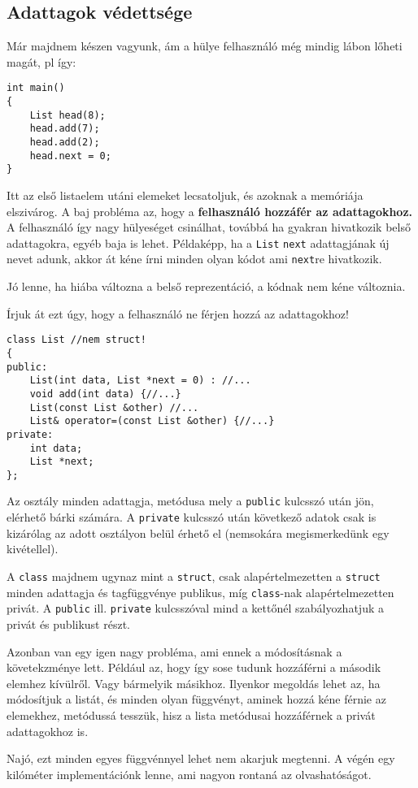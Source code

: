\documentclass[a4paper,11.5pt,table]{article}
\begin{document}
	\subsection{Adattagok védettsége}
	Már majdnem készen vagyunk, ám a hülye felhasználó még mindig lábon lőheti magát, pl így:
	\begin{lstlisting}
int main()
{
	List head(8);
	head.add(7);
	head.add(2);
	head.next = 0;
}
	\end{lstlisting}
	Itt az első listaelem utáni elemeket lecsatoljuk, és azoknak a memóriája elszivárog. A baj probléma az, hogy a \textbf{felhasználó hozzáfér az adattagokhoz.} A felhasználó így nagy hülyeséget csinálhat, továbbá ha gyakran hivatkozik belső adattagokra, egyéb baja is lehet. Példaképp, ha a \texttt{List} \texttt{next} adattagjának új nevet adunk, akkor át kéne írni minden olyan kódot ami \texttt{next}re hivatkozik.
	
	Jó lenne, ha hiába változna a belső reprezentáció, a kódnak nem kéne változnia. 
	
	Írjuk át ezt úgy, hogy a felhasználó ne férjen hozzá az adattagokhoz!

\begin{lstlisting}
class List //nem struct!
{
public:
	List(int data, List *next = 0) : //...
	void add(int data) {//...}
	List(const List &other) //...
	List& operator=(const List &other) {//...}
private:
	int data;
	List *next;
};
\end{lstlisting}
	Az osztály minden adattagja, metódusa mely a \texttt{public} kulcsszó után jön, elérhető bárki számára. A \texttt{private} kulcsszó után következő adatok csak is kizárólag az adott osztályon belül érhető el (nemsokára megismerkedünk egy kivétellel).

	A \texttt{class} majdnem ugynaz mint a \texttt{struct}, csak alapértelmezetten a \texttt{struct} minden adattagja és tagfüggvénye publikus, míg \texttt{class}-nak alapértelmezetten privát. A \texttt{public} ill. \texttt{private} kulcsszóval mind a kettőnél szabályozhatjuk a privát és publikust részt.
	
	\medskip
	Azonban van egy igen nagy probléma, ami ennek a módosításnak a követekzménye lett. Például az, hogy így sose tudunk hozzáférni a második elemhez kívülről. Vagy bármelyik másikhoz. Ilyenkor megoldás lehet az, ha módosítjuk a listát, és minden olyan függvényt,  aminek hozzá kéne férnie az elemekhez, metódussá tesszük, hisz a lista metódusai hozzáférnek a privát adattagokhoz is.
	
	Najó, ezt minden egyes függvénnyel lehet nem akarjuk megtenni. A végén egy kilóméter implementációnk lenne, ami nagyon rontaná az olvashatóságot.
	
\end{document}
